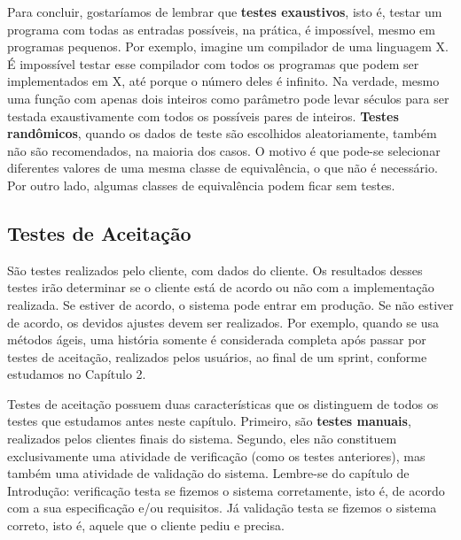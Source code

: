 \documentclass[
  11pt,
  twoside]{book}
\begin{document}
Para concluir, gostaríamos de lembrar que \textbf{testes exaustivos},
isto é, testar um programa com todas as entradas possíveis, na prática,
é impossível, mesmo em programas pequenos. Por exemplo, imagine um
compilador de uma linguagem X. É impossível testar esse compilador com
todos os programas que podem ser implementados em X, até porque o número
deles é infinito. Na verdade, mesmo uma função com apenas dois inteiros
como parâmetro pode levar séculos para ser testada exaustivamente com
todos os possíveis pares de inteiros. \textbf{Testes randômicos}, quando
os dados de teste são escolhidos aleatoriamente, também não são
recomendados, na maioria dos casos. O motivo é que pode-se selecionar
diferentes valores de uma mesma classe de equivalência, o que não é
necessário. Por outro lado, algumas classes de equivalência podem ficar
sem testes.

\hypertarget{testes-de-aceitauxe7uxe3o}{%
\subsection{Testes de Aceitação}\label{testes-de-aceitauxe7uxe3o}}


São testes realizados pelo cliente, com dados do cliente. Os resultados
desses testes irão determinar se o cliente está de acordo ou não com a
implementação realizada. Se estiver de acordo, o sistema pode entrar em
produção. Se não estiver de acordo, os devidos ajustes devem ser
realizados. Por exemplo, quando se usa métodos ágeis, uma história
somente é considerada completa após passar por testes de aceitação,
realizados pelos usuários, ao final de um sprint, conforme estudamos no
Capítulo 2.

Testes de aceitação possuem duas características que os distinguem de
todos os testes que estudamos antes neste capítulo. Primeiro, são
\textbf{testes manuais}, realizados pelos clientes finais do sistema.
Segundo, eles não constituem exclusivamente uma atividade de verificação
(como os testes anteriores), mas também uma atividade de validação do
sistema. Lembre-se do capítulo de Introdução: verificação testa se
fizemos o sistema corretamente, isto é, de acordo com a sua
especificação e/ou requisitos. Já validação testa se fizemos o sistema
correto, isto é, aquele que o cliente pediu e precisa.

\end{document}
